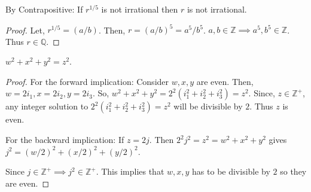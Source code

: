 \documentclass[titlepage,12pt]{book}
\begin{document}
\begin{solution}
    By Contrapositive: If $r^{1/5}$ is not irrational then $r$ is not irrational.
    \begin{proof}
        Let, $r^{1/5} = (a/b)$. Then, $r = (a/b)^{5} = a^{5}/b^{5}$.
        $a, b \in \mathbb{Z} \implies a^{5}, b^{5} \in \mathbb{Z}$.
        Thus $r \in \mathbb{Q}$.
    \end{proof}
\end{solution}

\begin{solution}
    $w^{2} + x^{2} + y^{2} = z^{2}$.


        
        
    \begin{proof}
        For the forward implication:
        Consider $w, x, y$ are even. Then,
        $w=2i_{1}, x=2i_{2}, y=2i_{3}$.
        So, $w^{2} + x^{2} + y^{2} = 2^{2}(i_{1}^{2}+i_{2}^{2}+i_{3}^{2}) = z^{2}$.
        Since, $z \in \mathbb{Z^{+}}$, any integer solution to $2^{2}(i_{1}^{2}+i_{2}^{2}+i_{3}^{2}) = z^{2}$ will be divisible by $2$.
        Thus $z$ is even.
        
        
        For the backward implication:
        If $z = 2j$. Then $2^{2}j^{2} = z^{2} = w^{2} + x^{2} + y^{2}$ gives
        $j^{2} = (w/2)^{2} + (x/2)^{2} + (y/2)^{2}$.

        Since $j \in \mathbb{Z^{+}} \implies j^{2} \in \mathbb{Z^{+}}$.
        This implies that $w, x, y$ has to be divisible by $2$ so they are even.

    \end{proof}
\end{solution}
\end{document}
